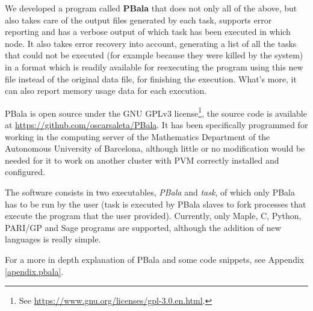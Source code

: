 We developed a program called \textbf{PBala} that does not only all of the above, but also takes care of the output files generated by each task, supports error reporting and has a verbose output of which task has been executed in which node. It also takes error recovery into account, generating a list of all the tasks that could not be executed (for example because they were killed by the system) in a format which is readily available for reexecuting the program using this new file instead of the original data file, for finishing the execution. What's more, it can also report memory usage data for each execution.

PBala is open source under the GNU GPLv3 license\footnote{See \url{https://www.gnu.org/licenses/gpl-3.0.en.html}.}, the source code is available at \url{https://github.com/oscarsaleta/PBala}. It has been specifically programmed for working in the computing server of the Mathematics Department of the Autonomous University of Barcelona, although little or no modification would be needed for it to work on another cluster with PVM correctly installed and configured.

The software consists in two executables, \emph{PBala} and \emph{task}, of which only PBala has to be run by the user (task is executed by PBala slaves to fork processes that execute the program that the user provided). Currently, only Maple, C, Python, PARI/GP and Sage programs are supported, although the addition of new languages is really simple.

For a more in depth explanation of PBala and some code snippets, see Appendix \ref{apendix.pbala}.








